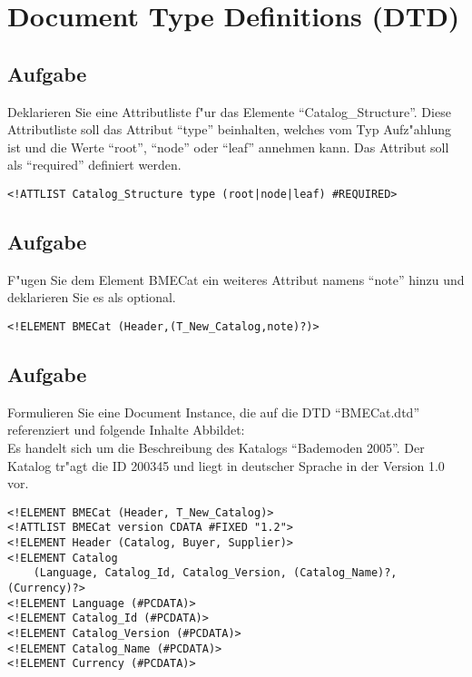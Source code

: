 

\section{Document Type Definitions (DTD)}


\subsection{Aufgabe}
Deklarieren Sie eine Attributliste f"ur das Elemente "`Catalog\_Structure"'.
Diese Attributliste soll das Attribut "`type"' beinhalten, welches vom Typ Aufz"ahlung ist und die Werte "`root"', "`node"' oder "`leaf"' annehmen kann.
Das Attribut soll als "`required"' definiert werden.\\

\lstset{language=XML}
\begin{lstlisting}
<!ATTLIST Catalog_Structure type (root|node|leaf) #REQUIRED>
\end{lstlisting}

\subsection{Aufgabe}
F"ugen Sie dem Element BMECat ein weiteres Attribut namens "`note"' hinzu und deklarieren Sie es als optional.\\

\lstset{language=XML}
\begin{lstlisting}
<!ELEMENT BMECat (Header,(T_New_Catalog,note)?)>
\end{lstlisting}


\subsection{Aufgabe}

Formulieren Sie eine Document Instance, die auf die DTD "`BMECat.dtd"' referenziert und folgende Inhalte Abbildet:\\
Es handelt sich um die Beschreibung des Katalogs "`Bademoden 2005"'.
Der Katalog tr"agt die ID 200345 und liegt in deutscher Sprache in der Version 1.0 vor.

\lstset{language=XML} %
\begin{lstlisting}
<!ELEMENT BMECat (Header, T_New_Catalog)>
<!ATTLIST BMECat version CDATA #FIXED "1.2">
<!ELEMENT Header (Catalog, Buyer, Supplier)>
<!ELEMENT Catalog
    (Language, Catalog_Id, Catalog_Version, (Catalog_Name)?, (Currency)?>
<!ELEMENT Language (#PCDATA)>
<!ELEMENT Catalog_Id (#PCDATA)>
<!ELEMENT Catalog_Version (#PCDATA)>
<!ELEMENT Catalog_Name (#PCDATA)>
<!ELEMENT Currency (#PCDATA)>
\end{lstlisting}

